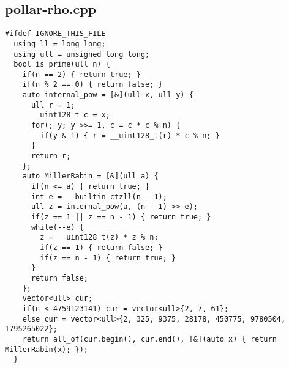 \documentclass[UTF8, a4paper, titlepage, twoside]{ctexart}
\begin{document}
\subsection{pollar-rho.cpp}
\begin{verbatim}
#ifdef IGNORE_THIS_FILE
  using ll = long long;
  using ull = unsigned long long;
  bool is_prime(ull n) {
    if(n == 2) { return true; }
    if(n % 2 == 0) { return false; }
    auto internal_pow = [&](ull x, ull y) {  
      ull r = 1;
      __uint128_t c = x;
      for(; y; y >>= 1, c = c * c % n) {
        if(y & 1) { r = __uint128_t(r) * c % n; }
      }
      return r;
    };
    auto MillerRabin = [&](ull a) {  
      if(n <= a) { return true; }
      int e = __builtin_ctzll(n - 1);
      ull z = internal_pow(a, (n - 1) >> e);
      if(z == 1 || z == n - 1) { return true; }
      while(--e) {
        z = __uint128_t(z) * z % n;
        if(z == 1) { return false; }
        if(z == n - 1) { return true; }
      }
      return false;
    };
    vector<ull> cur;
    if(n < 4759123141) cur = vector<ull>{2, 7, 61};
    else cur = vector<ull>{2, 325, 9375, 28178, 450775, 9780504, 1795265022};
    return all_of(cur.begin(), cur.end(), [&](auto x) { return MillerRabin(x); });
  }


\end{verbatim}
\end{document}
